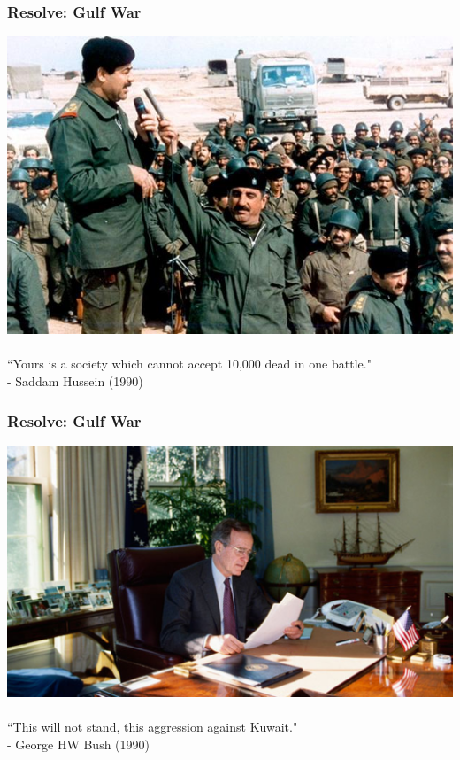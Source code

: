 \documentclass{beamer}
\begin{document}
\begin{frame} 
	\frametitle{\LARGE{Resolve: Gulf War}}
	\centering
	\includegraphics[width=\textwidth,height=0.63\textheight,keepaspectratio]{saddamiraqiarmy.jpg}
	\\~\\
	``Yours is a society which cannot accept 10,000 dead in one battle." \\
	\hspace*{160pt} - Saddam Hussein (1990)
\end{frame}

\begin{frame} 
	\frametitle{\LARGE{Resolve: Gulf War}}
	\centering
	\includegraphics[width=\textwidth,height=0.7\textheight,keepaspectratio]{ghwbush.jpg}
	\\~\\
	``This will not stand, this aggression against Kuwait." \\
	\hspace*{160pt} - George HW Bush (1990)
\end{frame}
\end{document}
